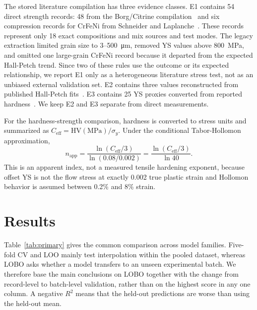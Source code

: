 \documentclass[5p,times,twocolumn]{elsarticle}
\begin{document}
The stored literature compilation has three evidence classes. E1 contains 54 direct strength records: 48 from the Borg/Citrine compilation~\cite{Borg2020} and six compression records for CrFeNi from Schneider and Laplanche~\cite{SchneiderCrFeNi2021}. These records represent only 18 exact compositions and mix sources and test modes. The legacy extraction limited grain size to 3--\SI{500}{\micro\meter}, removed YS values above \SI{800}{MPa}, and omitted one large-grain CrFeNi record because it departed from the expected Hall-Petch trend. Since two of these rules use the outcome or its expected relationship, we report E1 only as a heterogeneous literature stress test, not as an unbiased external validation set. E2 contains three values reconstructed from published Hall-Petch fits~\cite{Otto2013}. E3 contains 25 YS proxies converted from reported hardness~\cite{HuangTY2019}. We keep E2 and E3 separate from direct measurements.

For the hardness-strength comparison, hardness is converted to stress units and summarized as $C_{\mathrm{eff}}=\mathrm{HV(MPa)}/\sigma_y$. Under the conditional Tabor-Hollomon approximation,
\begin{equation}
n_{\mathrm{app}}=\frac{\ln(C_{\mathrm{eff}}/3)}{\ln(0.08/0.002)}
=\frac{\ln(C_{\mathrm{eff}}/3)}{\ln 40}.
\label{eq:napp}
\end{equation}
This is an apparent index, not a measured tensile hardening exponent, because offset YS is not the flow stress at exactly 0.002 true plastic strain and Hollomon behavior is assumed between 0.2\% and 8\% strain.

\section{Results}
\label{sec:results}

Table~\ref{tab:primary} gives the common comparison across model families. Five-fold CV and LOO mainly test interpolation within the pooled dataset, whereas LOBO asks whether a model transfers to an unseen experimental batch. We therefore base the main conclusions on LOBO together with the change from record-level to batch-level validation, rather than on the highest score in any one column. A negative $R^2$ means that the held-out predictions are worse than using the held-out mean.
\end{document}
